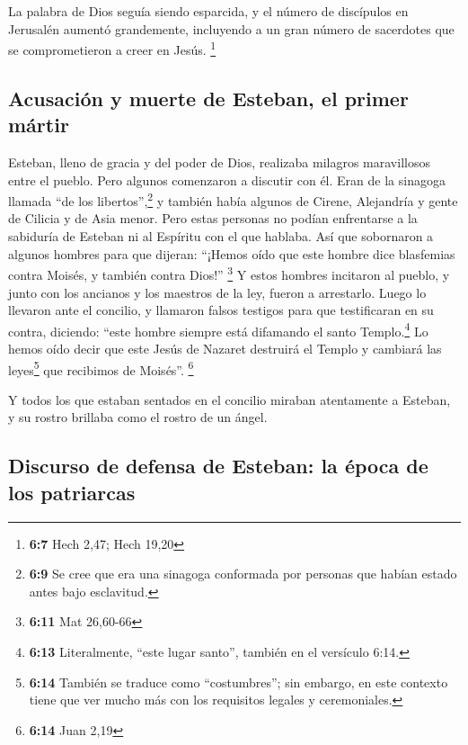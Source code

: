  La palabra de Dios seguía siendo esparcida, y el número
de discípulos en Jerusalén aumentó grandemente, incluyendo a un gran
número de sacerdotes que se comprometieron a creer en Jesús. \footnote{\textbf{6:7}
  Hech 2,47; Hech 19,20}

\hypertarget{acusaciuxf3n-y-muerte-de-esteban-el-primer-muxe1rtir}{%
\subsection{Acusación y muerte de Esteban, el primer
mártir}\label{acusaciuxf3n-y-muerte-de-esteban-el-primer-muxe1rtir}}

 Esteban, lleno de gracia y del poder de Dios, realizaba
milagros maravillosos entre el pueblo.  Pero algunos
comenzaron a discutir con él. Eran de la sinagoga llamada ``de los
libertos'',\footnote{\textbf{6:9} Se cree que era una sinagoga
  conformada por personas que habían estado antes bajo esclavitud.} y
también había algunos de Cirene, Alejandría y gente de Cilicia y de Asia
menor.  Pero estas personas no podían enfrentarse a la
sabiduría de Esteban ni al Espíritu con el que hablaba. 
Así que sobornaron a algunos hombres para que dijeran: ``¡Hemos oído que
este hombre dice blasfemias contra Moisés, y también contra Dios!''
\footnote{\textbf{6:11} Mat 26,60-66}  Y estos hombres
incitaron al pueblo, y junto con los ancianos y los maestros de la ley,
fueron a arrestarlo. Luego lo llevaron ante el concilio, 
y llamaron falsos testigos para que testificaran en su contra, diciendo:
``este hombre siempre está difamando el santo Templo.\footnote{\textbf{6:13}
  Literalmente, ``este lugar santo'', también en el versículo 6:14.}
 Lo hemos oído decir que este Jesús de Nazaret destruirá
el Templo y cambiará las leyes\footnote{\textbf{6:14} También se traduce
  como ``costumbres''; sin embargo, en este contexto tiene que ver mucho
  más con los requisitos legales y ceremoniales.} que recibimos de
Moisés''. \footnote{\textbf{6:14} Juan 2,19}

 Y todos los que estaban sentados en el concilio miraban
atentamente a Esteban, y su rostro brillaba como el rostro de un ángel.

\hypertarget{discurso-de-defensa-de-esteban-la-uxe9poca-de-los-patriarcas}{%
\subsection{Discurso de defensa de Esteban: la época de los
patriarcas}\label{discurso-de-defensa-de-esteban-la-uxe9poca-de-los-patriarcas}}

